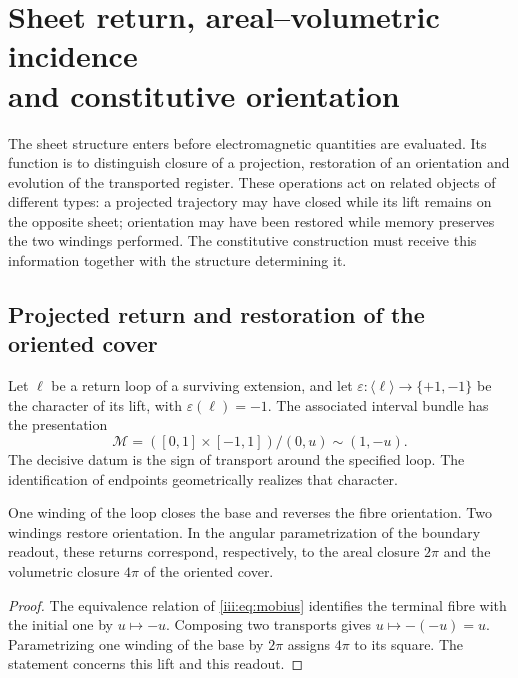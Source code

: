 \section[Sheet return, areal--volumetric incidence and constitutive orientation]{Sheet return, areal--volumetric incidence\\and constitutive orientation}
\label{iii:sec:hojas}
\label{nuclear:constitutiva-antecedente}

The sheet structure enters before electromagnetic quantities
are evaluated. Its function is to distinguish closure of a projection,
restoration of an orientation and evolution of the transported register.
These operations act on related objects of different types: a
projected trajectory may have closed while its lift remains
on the opposite sheet; orientation may have been restored while memory
preserves the two windings performed. The constitutive construction must receive
this information together with the structure determining it.

\subsection{Projected return and restoration of the oriented cover}

Let $\ell$ be a return loop of a surviving extension, and let
$\varepsilon:\langle\ell\rangle\to\{+1,-1\}$ be the character of its
lift, with $\varepsilon(\ell)=-1$. The associated interval bundle
has the presentation
\begin{equation}
 \mathcal M=([0,1]\times[-1,1])/{(0,u)\sim(1,-u)}.
 \label{iii:eq:mobius}
\end{equation}
The decisive datum is the sign of transport around the specified loop. The
identification of endpoints geometrically realizes that character.

\begin{proposition}
One winding of the loop closes the base and reverses the fibre orientation. Two
windings restore orientation. In the angular parametrization of the boundary
readout, these returns correspond, respectively, to the areal closure $2\pi$ and
the volumetric closure $4\pi$ of the oriented cover.
\end{proposition}
\begin{proof}
The equivalence relation of \eqref{iii:eq:mobius} identifies the terminal fibre
with the initial one by $u\mapsto-u$. Composing two transports gives
$u\mapsto-(-u)=u$. Parametrizing one winding of the base by $2\pi$ assigns $4\pi$
to its square. The statement concerns this lift and this readout.
\end{proof}


